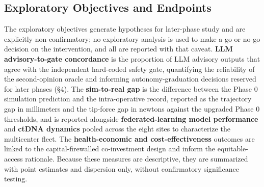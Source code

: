 \subsection{Exploratory Objectives and Endpoints}

The exploratory objectives generate hypotheses for later-phase study and are
explicitly non-confirmatory; no exploratory analysis is used to make a go or no-go
decision on the intervention, and all are reported with that caveat. \textbf{LLM
advisory-to-gate concordance} is the proportion of LLM advisory outputs that agree
with the independent hard-coded safety gate, quantifying the reliability of the
second-opinion oracle and informing autonomy-graduation decisions reserved for
later phases (\S4). The \textbf{sim-to-real gap} is the difference between the
Phase 0 simulation prediction and the intra-operative record, reported as the
trajectory gap in millimeters and the tip-force gap in newtons against the upgraded
Phase 0 thresholds, and is reported alongside \textbf{federated-learning model
performance} and \textbf{ctDNA dynamics} pooled across the eight sites to
characterize the multicenter fleet. The \textbf{health-economic and
cost-effectiveness} outcomes are linked to the capital-firewalled co-investment
design and inform the equitable-access rationale. Because these measures are
descriptive, they are summarized with point estimates and dispersion only, without
confirmatory significance testing.
